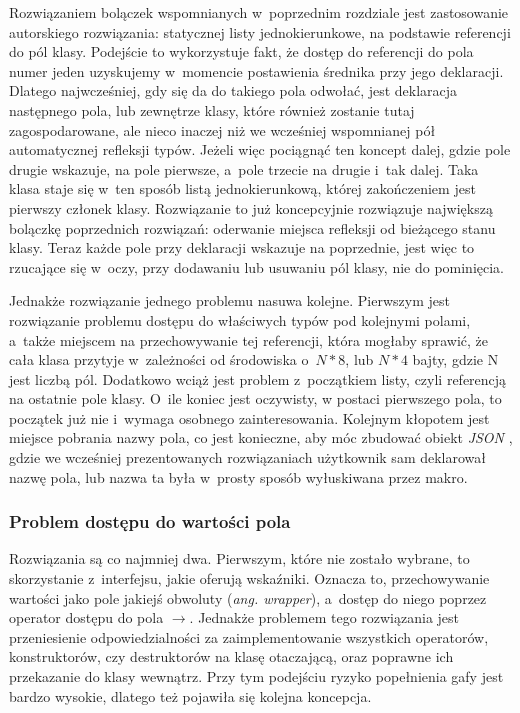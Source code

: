 \documentclass[12pt]{article}
\newcommand{\n}{\newline}
\newcommand{\nonpl}[1]{{\it #1}}
\newcommand{\ang}[1]{\nonpl{ang. #1}}
\newcommand{\JSON}{\nonpl{JSON} }
\begin{document}
{{			Rozwiązaniem bolączek wspomnianych w~poprzednim rozdziale jest zastosowanie autorskiego rozwiązania: statycznej listy jednokierunkowe, na podstawie
			referencji do pól klasy. Podejście to wykorzystuje fakt, że dostęp do referencji do pola numer jeden uzyskujemy w~momencie postawienia średnika przy jego deklaracji.
			Dlatego najwcześniej, gdy się da do takiego pola odwołać, jest deklaracja następnego pola, lub zewnętrze klasy, które również zostanie tutaj zagospodarowane,
			ale nieco inaczej niż we wcześniej wspomnianej pół automatycznej refleksji typów. Jeżeli więc pociągnąć ten koncept dalej, gdzie pole drugie wskazuje, na
			pole pierwsze, a~pole trzecie na drugie i~tak dalej. Taka klasa staje się w~ten sposób listą jednokierunkową, której zakończeniem jest pierwszy członek klasy.
			Rozwiązanie to już koncepcyjnie rozwiązuje największą bolączkę poprzednich rozwiązań: oderwanie miejsca refleksji od bieżącego stanu klasy.
			Teraz każde pole przy deklaracji wskazuje na poprzednie, jest więc to rzucające się w~oczy, przy dodawaniu lub usuwaniu pól klasy, nie do pominięcia.\n

			Jednakże rozwiązanie jednego problemu nasuwa kolejne. Pierwszym jest rozwiązanie problemu dostępu do właściwych typów pod kolejnymi polami, a~także
			miejscem na przechowywanie tej referencji, która mogłaby sprawić, że cała klasa przytyje w~zależności od środowiska o~$N * 8$, lub $N * 4$ bajty,
			gdzie N jest liczbą pól. Dodatkowo wciąż jest problem z~początkiem listy, czyli referencją na ostatnie pole klasy. O~ile koniec jest oczywisty,
			w postaci pierwszego pola, to początek już nie i~wymaga osobnego zainteresowania. Kolejnym kłopotem jest miejsce pobrania nazwy pola, co jest
			konieczne, aby móc zbudować obiekt \JSON, gdzie we wcześniej prezentowanych rozwiązaniach użytkownik sam deklarował nazwę pola, lub nazwa ta
			była w~prosty sposób wyłuskiwana przez makro.\n

			{
				\subsubsection{Problem dostępu do wartości pola}

				Rozwiązania są co najmniej dwa. Pierwszym, które nie zostało wybrane, to skorzystanie z~interfejsu, jakie oferują wskaźniki. Oznacza to,
				przechowywanie wartości jako pole jakiejś obwoluty (\ang{wrapper}), a~dostęp do niego poprzez operator dostępu do pola $\rightarrow$. Jednakże problemem
				tego rozwiązania jest przeniesienie odpowiedzialności za zaimplementowanie wszystkich operatorów, konstruktorów, czy destruktorów
				na klasę otaczającą, oraz poprawne ich przekazanie do klasy wewnątrz. Przy tym podejściu ryzyko popełnienia gafy jest bardzo wysokie, dlatego też
				pojawiła się kolejna koncepcja.\n

}}}
\end{document}
